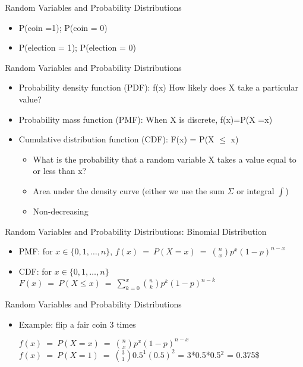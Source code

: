 \documentclass[presentation]{beamer}
\begin{document}
\begin{frame}[label={sec:orgc16df96}]{Random Variables and Probability Distributions}
\begin{itemize}
\item P(coin =1); P(coin = 0)
\item P(election = 1); P(election = 0)
\end{itemize}
\end{frame}


\begin{frame}[label={sec:orgddbf430}]{Random Variables and Probability Distributions}
\begin{itemize}
\item \alert{Probability density function (PDF)}: f(x) How likely does X take a particular value?
\item \alert{Probability mass function (PMF)}: When X is discrete, f(x)=P(X =x)
\end{itemize}

\pause

\begin{itemize}
\item \alert{Cumulative distribution function (CDF)}: F(x) = P(X \(\leq\) x)
\begin{itemize}
\item What is the probability that a random variable X takes a value equal to or less than x?
\item Area under the density curve (either we use the sum \(\Sigma\) or integral \(\int\))
\item Non-decreasing
\end{itemize}
\end{itemize}
\end{frame}


\begin{frame}[label={sec:org44ca188}]{Random Variables and Probability Distributions: Binomial Distribution}
\begin{itemize}
\item \alert{PMF}: for \(x \in \{0, 1, \dots, n\}\),
\(f(x) \ = \ P(X = x) \ = \ {n \choose x} p^x (1-p)^{n-x}\)

\item \alert{CDF}: for \(x \in \{0, 1, \dots, n\}\)
\(F(x) \ = \ P(X \le x) \ = \ \sum_{k = 0}^x {n\choose k} p^k (1-p)^{n-k}\)
\end{itemize}
\end{frame}



\begin{frame}[label={sec:org7b98800}]{Random Variables and Probability Distributions}
\begin{itemize}
\item Example: flip a fair coin 3 times

\(f(x) \ = \ P(X = x) \ = \ {n \choose x} p^x (1-p)^{n-x}\)
\(f(x) \ = \ P(X = 1) \ = \ {3 \choose 1} 0.5^1 (0.5)^{2}\) = 3*0.5*0.5\(^{\text{2}}\) = 0.375\$
\end{itemize}
\end{frame}
\end{document}

